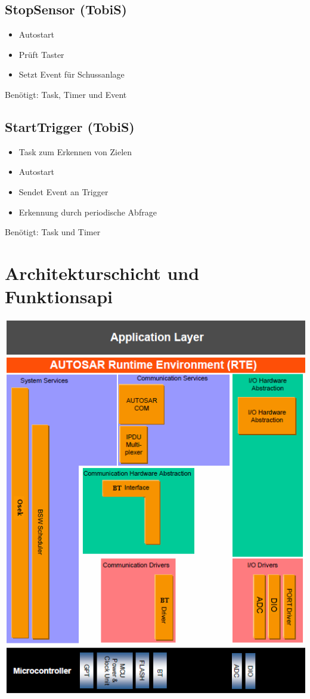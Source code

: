 \documentclass[a4paper,11pt]{scrreprt}
\begin{document}
\subsection*{StopSensor (TobiS)}

\begin{itemize}
 \item Autostart
 \item Prüft Taster
 \item Setzt Event für Schussanlage
\end{itemize}

Benötigt: Task, Timer und Event


\subsection*{StartTrigger (TobiS)}

\begin{itemize}
 \item Task zum Erkennen von Zielen
 \item Autostart
 \item Sendet Event an Trigger
 \item Erkennung durch periodische Abfrage
\end{itemize}

Benötigt: Task und Timer

\section{Architekturschicht und Funktionsapi}

\includegraphics{Komponenten.png}
\end{document}
